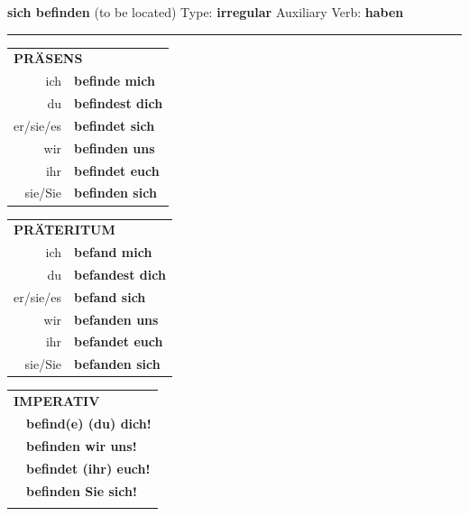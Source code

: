 \documentclass[10pt,a4paper]{revtex4-2}
\begin{document}
\begin{verbbox}
        {\Large \bf sich befinden} (to be located) \hfill Type: \textbf{irregular} \hfill Auxiliary Verb: \textbf{haben} 
    
       \vspace{5pt}

    \hrule
    
    \vspace{5pt}

  \begin{tabular}{rl}
     \multicolumn{2}{l}{\textbf{PRÄSENS} }\\
    ich & \textbf{befinde mich}\\
    du & \textbf{befindest dich}\\
    er/sie/es & \textbf{befindet sich}\\
    wir & \textbf{befinden uns}\\
    ihr & \textbf{befindet euch}\\
    sie/Sie & \textbf{befinden sich}\\
  \end{tabular}
  \hfill
     \begin{tabular}{rl}
    \multicolumn{2}{l}{\textbf{PRÄTERITUM} }\\
    ich & \textbf{befand mich}\\
    du & \textbf{befandest dich}\\
    er/sie/es & \textbf{befand sich}\\
    wir & \textbf{befanden uns}\\
    ihr & \textbf{befandet euch}\\
    sie/Sie & \textbf{befanden sich}\\
  \end{tabular}
  \hfill
  \begin{tabular}{rl}
     \multicolumn{2}{l}{\textbf{IMPERATIV} }\\
   & \textbf{befind(e) (du) dich!}\\
   & \textbf{befinden wir uns!}\\
   & \textbf{befindet (ihr) euch!}\\
   & \textbf{befinden Sie sich!}\\
   & \vspace{10pt}
  \end{tabular}

    \vspace{10pt}


\end{verbbox}
\end{document}
